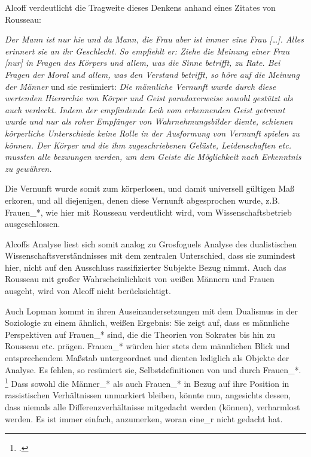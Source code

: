 Alcoff verdeutlicht die Tragweite dieses Denkens anhand eines Zitates von Rousseau:
\begin{myenv}
  \textit{
  \glqq Der Mann ist nur hie und da Mann, die Frau aber ist immer eine Frau
  […]. Alles erinnert sie an ihr Geschlecht. So empfiehlt er: Ziehe die Meinung
  einer Frau [nur] in Fragen des Körpers und allem, was die Sinne betrifft, zu
  Rate. Bei Fragen der Moral und allem, was den Verstand betrifft, so höre auf
  die Meinung der Männer \grqq \footnotemark {}} und sie resümiert: \textit{ \glqq Die männliche Vernunft wurde
  durch diese wertenden Hierarchie von Körper und Geist paradoxerweise sowohl
  gestützt als auch verdeckt. Indem der empfindende Leib vom erkennenden Geist
  getrennt wurde und nur als roher Empfänger von Wahrnehmungsbilder diente,
  schienen körperliche Unterschiede keine Rolle in der Ausformung von Vernunft
  spielen zu können. Der Körper und die ihm zugeschriebenen Gelüste,
  Leidenschaften etc. mussten alle bezwungen werden, um dem Geiste die
Möglichkeit nach Erkenntnis zu gewähren.\grqq \footnotemark {} } \end{myenv}


Die Vernunft wurde somit zum körperlosen, und damit universell gültigen Maß
erkoren, und all diejenigen, denen diese Vernunft abgesprochen wurde, z.B.
Frauen\_*, wie hier mit Rousseau verdeutlicht wird, vom Wissenschaftsbetrieb
ausgeschlossen.

Alcoffs Analyse liest sich somit analog zu Grosfoguels Analyse
des dualistischen Wissenschaftsverständnisses mit dem zentralen Unterschied,
dass sie zumindest hier, nicht auf den Ausschluss rassifizierter Subjekte Bezug
nimmt. Auch das Rousseau mit großer Wahrscheinlichkeit von \textit{w}eißen Männern und
Frauen ausgeht, wird von Alcoff nicht berücksichtigt. 

Auch Lopman kommt in
ihren Auseinandersetzungen mit dem Dualismus in der Soziologie zu einem
ähnlich, weißen Ergebnis: Sie zeigt auf, dass es männliche Perspektiven auf
Frauen\_* sind, die die Theorien von Sokrates bis hin zu Rousseau etc. prägen.
Frauen\_* würden hier stets dem männlichen Blick und entsprechendem Maßstab
untergeordnet und dienten lediglich als Objekte der Analyse. Es fehlen, so
resümiert sie, Selbstdefinitionen von und durch Frauen\_*. \footnotemark
\footcitetext{lopman} 
Dass sowohl die
Männer\_* als auch Frauen\_* in Bezug auf ihre Position in rassistischen
Verhältnissen unmarkiert bleiben, könnte nun, angesichts dessen, dass niemals
alle Differenzverhältnisse mitgedacht werden (können), verharmlost werden. Es
ist immer einfach, anzumerken, woran eine\_r nicht gedacht hat.

